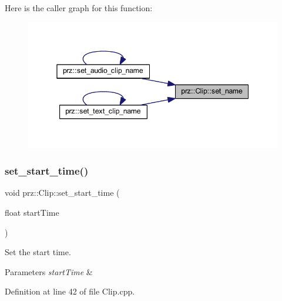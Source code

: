 Here is the caller graph for this function\+:
\nopagebreak
\begin{figure}[H]
\begin{center}
\leavevmode
\includegraphics[width=345pt]{classprz_1_1_clip_a4228c95183be5c9e2bd9eabd58828243_icgraph}
\end{center}
\end{figure}
\mbox{\label{classprz_1_1_clip_a7cbb55c3a344ab273d655f3b1e3fe5d1}} 
\subsubsection{\texorpdfstring{set\_start\_time()}{set\_start\_time()}}
{\footnotesize\ttfamily void prz\+::\+Clip\+::set\+\_\+start\+\_\+time (\begin{DoxyParamCaption}\item[{float}]{start\+Time }\end{DoxyParamCaption})}



Set the start time. 


\begin{DoxyParams}{Parameters}
{\em start\+Time} & \\
\hline
\end{DoxyParams}


Definition at line 42 of file Clip.\+cpp.

